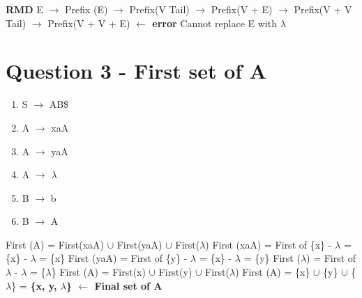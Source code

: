 \documentclass{article}
\begin{document}
\noindent\textbf{RMD}\newline
E $\rightarrow$ Prefix (E) $\rightarrow$ Prefix(V Tail) $\rightarrow$ Prefix(V + E)
$\rightarrow$ Prefix(V + V Tail) $\rightarrow$ Prefix(V + V + E) \textbf{$\leftarrow$ error}\newline
Cannot replace E with $\lambda$

\section*{Question 3 - First set of A}
\vspace{-2em}
\begin{multicols}{2}
  \begin{enumerate}
    \setlength\itemsep{-.25em}
    \item S $\rightarrow$ AB\$
    \item A $\rightarrow$ xaA
    \item A $\rightarrow$ yaA
    \item A $\rightarrow$ $\lambda$
    \item B $\rightarrow$ b
    \item B $\rightarrow$ A
  \end{enumerate}
\setlength{\leftskip}{-12em}
First (A) = First(xaA) $\cup$  First(yaA) $\cup$  First($\lambda$)\newline
\indent\hspace{.25cm}First (xaA) = First of \{x\} - $\lambda$ = \{x\} - $\lambda$ = \{x\}\newline
\indent\hspace{.25cm}First (yaA) = First of \{y\} - $\lambda$ = \{x\} - $\lambda$ = \{y\}\newline
\indent\hspace{.25cm}First ($\lambda$) = First of {$\lambda$} - $\lambda$ = \{$\lambda$\}\newline
First (A) = First(x) $\cup$  First(y) $\cup$  First($\lambda$)\newline
First (A) = \{x\} $\cup$  \{y\} $\cup$  \{$\lambda$\} = \textbf{\{x, y, $\lambda$\} $\leftarrow$ Final set of A}
\end{multicols}
\end{document}
